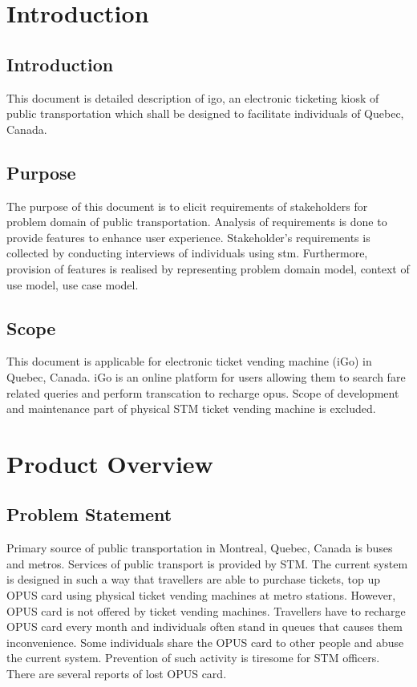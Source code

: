 \documentclass[11pt, english]{report}
\begin{document}
\newcommand{\CC}{C\nolinebreak\hspace{-.05em}\raisebox{.4ex}{\tiny\bf +}\nolinebreak\hspace{-.10em}\raisebox{.4ex}{\tiny\bf +}}
\def\CC{{C\nolinebreak[4]\hspace{-.05em}\raisebox{.4ex}{\tiny\bf ++}}}

\tableofcontents
\newpage

\chapter{Introduction}
\section{Introduction}
This document is detailed description of \gls{igo}, an electronic ticketing kiosk of public transportation which shall be designed to facilitate individuals of Quebec, Canada.

\section{Purpose}
The purpose of this document is to elicit requirements of stakeholders for problem domain of public transportation. Analysis of requirements is done to provide features to enhance user experience. Stakeholder's requirements is collected by conducting interviews of individuals using \gls{stm}. Furthermore, provision of features is realised by representing problem domain model, context of use model, use case model.

\section{Scope}
This document is applicable for electronic ticket vending machine (iGo) in Quebec, Canada. iGo is an online platform for users allowing them to search fare related queries and perform transcation to recharge \gls{opus}. Scope of development and maintenance part of physical STM ticket vending machine is excluded.   


\chapter{Product Overview}

\section{Problem Statement}
Primary source of public transportation in Montreal, Quebec, Canada is buses and metros. Services of public transport is provided by STM. The current system is designed in such a way that travellers are able to purchase tickets, top up OPUS card using physical ticket vending machines at metro stations. However, OPUS card is not offered by ticket vending machines. Travellers have to recharge OPUS card every month and individuals often stand in queues that causes them inconvenience. Some individuals share the OPUS card to other people and abuse the current system. Prevention of such activity is tiresome for STM officers. There are several reports of lost OPUS card. \\
\end{document}
